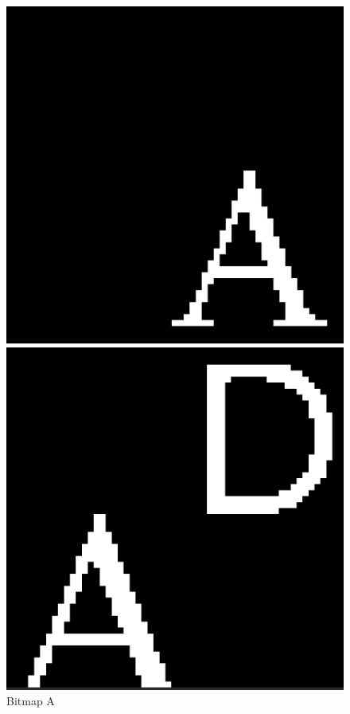 \begin{figure}[!htb]
      \includegraphics[width=\linewidth]{figures/Bitmap-A}
      \caption{Bitmap A}\label{Bitmap-A}
    \endminipage\hfill
      \includegraphics[width=\linewidth]{figures/Bitmap-AD}

\end{figure}
